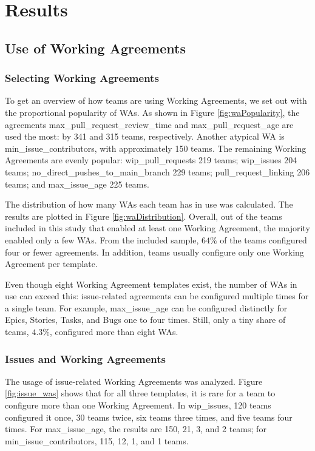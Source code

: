 \chapter{Results}

\section{Use of Working Agreements}

\subsection{Selecting Working Agreements}

To get an overview of how teams are using Working Agreements, we set out with the proportional popularity of WAs. As shown in Figure \ref{fig:waPopularity}, the agreements max\_pull\_request\_review\_time and max\_pull\_request\_age are used the most: by 341 and 315 teams, respectively. Another atypical WA is min\_issue\_contributors, with approximately 150 teams. The remaining Working Agreements are evenly popular: wip\_pull\_requests 219 teams; wip\_issues 204 teams; no\_direct\_pushes\_to\_main\_branch 229 teams; pull\_request\_linking 206 teams; and max\_issue\_age 225 teams.



The distribution of how many WAs each team has in use was calculated. The results are plotted in Figure \ref{fig:waDistribution}. Overall, out of the teams included in this study that enabled at least one Working Agreement, the majority enabled only a few WAs. From the included sample, $64\%$ of the teams configured four or fewer agreements. In addition, teams usually configure only one Working Agreement per template.



Even though eight Working Agreement templates exist, the number of WAs in use can exceed this: issue-related agreements can be configured multiple times for a single team. For example, max\_issue\_age can be configured distinctly for Epics, Stories, Tasks, and Bugs one to four times. Still, only a tiny share of teams, $4.3\%$, configured more than eight WAs.

\subsection{Issues and Working Agreements}

The usage of issue-related Working Agreements was analyzed. Figure \ref{fig:issue_was} shows that for all three templates, it is rare for a team to configure more than one Working Agreement. In wip\_issues, 120 teams configured it once, 30 teams twice, six teams three times, and five teams four times. For max\_issue\_age, the results are 150, 21, 3, and 2 teams; for min\_issue\_contri\-butors, 115, 12, 1, and 1 teams.

